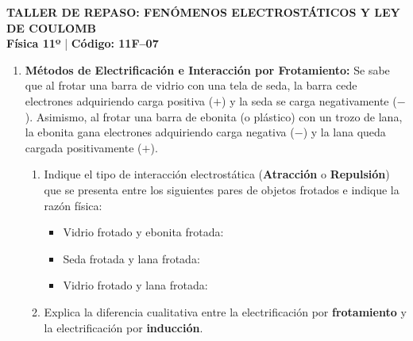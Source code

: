 \documentclass[11pt, letterpaper]{article}
\newif\ifshowanswers
\newcommand{\answer}[1]{ 
	\ifshowanswers 
	\par\vspace{0.15cm} 
	\begin{tcolorbox}[colback=blue!5!white, colframe=blue!60!white, arc=1mm, boxrule=0.5pt, title=\textbf{\footnotesize SOLUCIÓN PASO A PASO (DOCENTE)}] 
		\color{blue!80!black}\footnotesize #1 
	\end{tcolorbox} 
	\par\vspace{0.15cm} 
	\else 
	\par\vspace{0.3cm} 
	\fi 
}
\begin{document}
 
	
	\begin{center} 
		{\large \textbf{TALLER DE REPASO: FENÓMENOS ELECTROSTÁTICOS Y LEY DE COULOMB}}\\[0.1cm] 
		{\small \textbf{Física 11º} \quad | \quad \textbf{Código: 11F--07} } 
	\end{center} 
	
	\begin{enumerate}[leftmargin=*, itemsep=0.8cm] 
		
		\item \textbf{ Métodos de Electrificación e Interacción por Frotamiento:} 
		Se sabe que al frotar una barra de vidrio con una tela de seda, la barra cede electrones adquiriendo carga positiva ($+$) y la seda se carga negativamente ($-$). Asimismo, al frotar una barra de ebonita (o plástico) con un trozo de lana, la ebonita gana electrones adquiriendo carga negativa ($-$) y la lana queda cargada positivamente ($+$). 
		\begin{enumerate}[label=\alph*), itemsep=0.2cm] 
			\item Indique el tipo de interacción electrostática (\textbf{Atracción} o \textbf{Repulsión}) que se presenta entre los siguientes pares de objetos frotados e indique la razón física: 
			\begin{itemize}[itemsep=0.1cm] 
				\item Vidrio frotado y ebonita frotada: \underline{\hspace{5cm}} 
				\item Seda frotada y lana frotada: \underline{\hspace{5cm}} 
				\item Vidrio frotado y lana frotada: \underline{\hspace{5cm}} 
			\end{itemize} 
			\item Explica la diferencia cualitativa entre la electrificación por \textbf{frotamiento} y la electrificación por \textbf{inducción}. 
		\end{enumerate} 
		\answer{ 
			\textbf{a) Tipo de interacción por ley de signos:} 
			\begin{itemize}[itemsep=0.1cm] 
				\item Vidrio ($+$) y ebonita ($-$): \textbf{Atracción} (cargas de diferente signo se atraen). 
				\item Seda ($-$) y lana ($+$): \textbf{Atracción} (cargas de diferente signo se atraen). 
				\item Vidrio ($+$) y lana ($+$): \textbf{Repulsión} (cargas de igual signo se repelen). 
			\end{itemize} 
			\textbf{b) Diferencia entre frotamiento e inducción:} 
			En el frotamiento hay contacto directo y transferencia real de electrones entre dos cuerpos de diferente afinidad electrónica. En la inducción no hay contacto directo; el cuerpo cargado induce un reordenamiento o polarización de cargas en el cuerpo neutro sin transferirle carga inicialmente. 
		} 
		

\end{enumerate}
\end{document}
